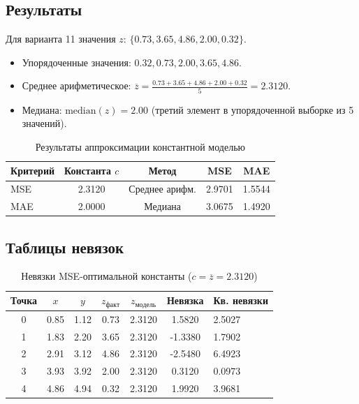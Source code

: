 \subsection{Результаты}

Для варианта 11 значения $z$: $\{0.73, 3.65, 4.86, 2.00, 0.32\}$.

\begin{itemize}
    \item Упорядоченные значения: $0.32, 0.73, 2.00, 3.65, 4.86$.
    \item Среднее арифметическое: $\overline{z} = \frac{0.73 + 3.65 + 4.86 + 2.00 + 0.32}{5} = 2.3120$.
    \item Медиана: $\text{median}(z) = 2.00$ (третий элемент в упорядоченной выборке из 5 значений).
\end{itemize}

\begin{table}[H]
    \centering
    \caption{Результаты аппроксимации константной моделью}
    \label{tab:const_results}
    \begin{tabular}{|l|c|c|c|c|}
        \hline
        \textbf{Критерий} & \textbf{Константа $c$} & \textbf{Метод} & \textbf{MSE} & \textbf{MAE} \\
        \hline
        MSE & 2.3120 & Среднее арифм. & 2.9701 & 1.5544 \\
        MAE & 2.0000 & Медиана & 3.0675 & 1.4920 \\
        \hline
    \end{tabular}
\end{table}

\subsection{Таблицы невязок}

\begin{table}[H]
    \centering
    \caption{Невязки MSE-оптимальной константы ($c = \overline{z} = 2.3120$)}
    \label{tab:const_mse}
    \begin{tabular}{|c|c|c|c|c|c|}
        \hline
        \textbf{Точка} & \textbf{$x$} & \textbf{$y$} & \textbf{$z_{факт}$} & \textbf{$z_{модель}$} & \textbf{Невязка} & \textbf{Кв. невязки} \\
         & 0.85 & 1.12 & 0.73 & 2.3120 & 1.5820 & 2.5027 \\
        1 & 1.83 & 2.20 & 3.65 & 2.3120 & -1.3380 & 1.7902 \\
        2 & 2.91 & 3.12 & 4.86 & 2.3120 & -2.5480 & 6.4923 \\
        3 & 3.93 & 3.92 & 2.00 & 2.3120 & 0.3120 & 0.0973 \\
        4 & 4.86 & 4.94 & 0.32 & 2.3120 & 1.9920 & 3.9681 \\
        \hline
    \end{tabular}
\end{table}


